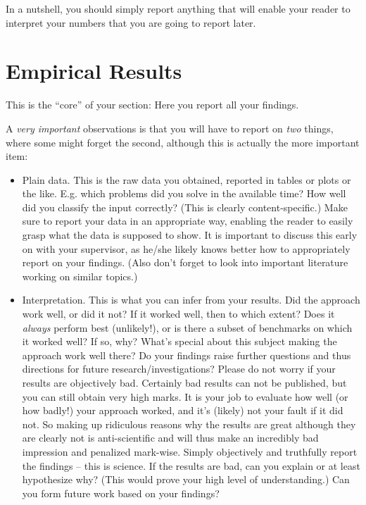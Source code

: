 In a nutshell, you should simply report anything that will enable your reader to interpret your numbers that you are going to report later. 


\section{Empirical Results}

This is the ``core'' of your section: Here you report all your findings. 

A \emph{very important} observations is that you will have to report on \emph{two} things, where some might forget the second, although this is actually the more important item:

\begin{itemize}
  \item Plain data. This is the raw data you obtained, reported in tables or plots or the like. E.g. which problems did you solve in the available time? How well did you classify the input correctly? (This is clearly content-specific.) Make sure to report your data in an appropriate way, enabling the reader to easily grasp what the data is supposed to show. It is important to discuss this early on with your supervisor, as he/she likely knows better how to appropriately report on your findings. (Also don't forget to look into important literature working on similar topics.)
  \item Interpretation. This is what you can infer from your results. Did the approach work well, or did it not? If it worked well, then to which extent? Does it \emph{always} perform best (unlikely!), or is there a subset of benchmarks on which it worked well? If so, why? What's special about this subject making the approach work well there? Do your findings raise further questions and thus directions for future research/investigations? Please do not worry if your results are objectively bad. Certainly bad results can not be published, but you can still obtain very high marks. It is your job to evaluate how well (or how badly!) your approach worked, and it's (likely) not your fault if it did not. So making up ridiculous reasons why the results are great although they are clearly not is anti-scientific and will thus make an incredibly bad impression and penalized mark-wise. Simply objectively and truthfully report the findings -- this is science. If the results are bad, can you explain or at least hypothesize why? (This would prove your high level of understanding.) Can you form future work based on your findings?
\end{itemize}

